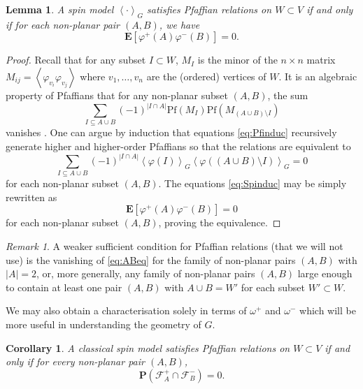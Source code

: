 \documentclass{article}
\newtheorem{lemma}[theorem]{Lemma}
\newtheorem{corollary}[theorem]{Corollary}
\numberwithin{equation}{section}
\theoremstyle{definition}
\theoremstyle{definition}
\theoremstyle{remark}
\newtheorem{remark}{Remark}
\newcommand{\E}{\mathbb{E}}
\newcommand\vp{\varphi}
\newcommand{\w}{\omega}
\renewcommand{\E}{\mathrm{\mathbf{E}}}
\newcommand{\F}{\mathcal{F}}
\newcommand{\Pf}{\mathrm{{Pf}}}
\begin{document}
\begin{lemma} \label{lem:Marcin_Pfaf}
    A spin model $\left< \cdot \right>_{G}$ satisfies Pfaffian relations 
    on $W \subset V$ if and only if for each non-planar pair $(A,B)$, we have
    \begin{equation}\label{eq:ABeq}
	    \E [ \vp^+(A) \vp^-(B) ] = 0.
    \end{equation}
\end{lemma}
\begin{proof}
	Recall that for any subset $I \subset W$, $M_I$ is the minor of the $n \times n$ matrix $M_{ij} = \left< \vp_{v_i} \vp_{v_j} \right>$ where $v_1,\ldots,v_n$ are the (ordered) vertices of $W$. It is an algebraic property of Pfaffians that for any non-planar subset $(A,B)$, the sum
	\begin{equation}\label{eq:Pfinduc}
		\sum_{ I \subseteq A \cup B} (-1)^{|I \cap A|} \Pf(M_{I}) \Pf(M_{( A \cup B) \setminus I})
	\end{equation} 
	vanishes \cite[Corollary 9]{Lis22a}. One can argue by induction that equations \eqref{eq:Pfinduc} recursively generate higher and higher-order Pfaffians so that the relations are equivalent to 
	\begin{equation}\label{eq:Spinduc}
		\sum_{ I \subseteq A \cup B} (-1)^{|I \cap A|} \left<\vp(I)  \right>_G \left<\vp((A \cup B) \setminus I) \right>_G = 0
	\end{equation} 
	for each non-planar subset $(A,B)$. The equations \eqref{eq:Spinduc} may be simply rewritten as 
	\[
	\E[ \vp^+(A) \vp^-(B) ] = 0
	\]
	for each non-planar subset $(A,B)$, proving the equivalence. 
\end{proof}
\begin{remark}\label{remark:minimal}
A weaker sufficient condition for Pfaffian relations (that we will not use) is the vanishing of \eqref{eq:ABeq} for the family of non-planar pairs $(A,B)$ with $|A| = 2$, or, more generally, any family of non-planar pairs $(A,B)$ large enough to contain at least one pair $(A,B)$ with $A \cup B = W'$ for each subset $W' \subset W$. 
\end{remark}
We may also obtain a characterisation solely in terms of $\w^+$ and $\w^-$ which will be more useful in understanding the geometry of $G$.
\begin{corollary} \label{cor:pfaff}
    A classical spin model satisfies Pfaffian relations on $W \subset V$ if and only if for every non-planar pair $(A,B)$, 
    \begin{equation}\label{eq:pfaffchar}
        \mathbf{P}(\F_A^+ \cap \F^-_{B}) = 0. 
    \end{equation}
\end{corollary}
\end{document}
